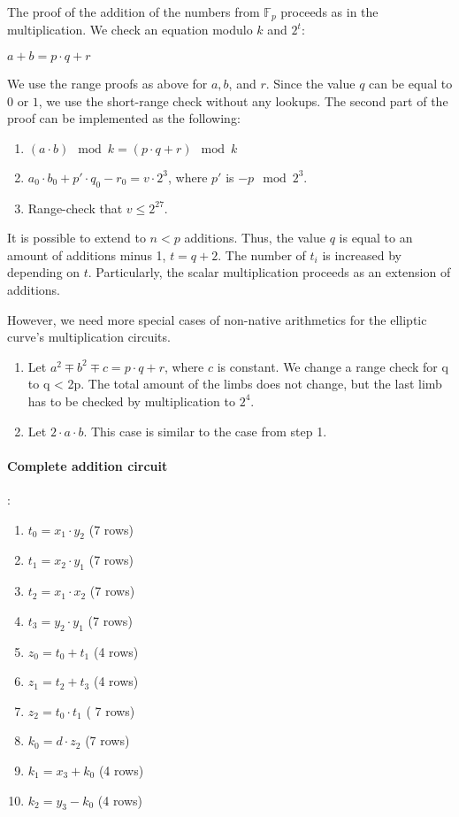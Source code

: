 The proof of the addition of the numbers from $\mathbb{F}_p$ proceeds as in the multiplication.
We check an equation modulo $k$ and $2^t$:
\begin{center}
$a + b = p\cdot q + r$
\end{center}
We use the range proofs as above for $a, b$, and $r$.
Since the value $q$ can be equal to $0$ or $1$, we use the short-range check without any lookups.
The second part of the proof can be implemented as the following:
\begin{enumerate}
\item $(a\cdot b) \mod k = (p \cdot q + r) \mod k$
\item $a_0 \cdot b_0 + p'\cdot q_0 - r_0 = v \cdot 2^3$, where $p'$ is $- p \mod 2^3$.
\item Range-check that $v \leq 2^{27}$.
\end{enumerate} 
It is possible to extend to $n < p$ additions.
Thus, the value $q$ is equal to an amount of additions minus 1, $t = q + 2$.
The number of $t_i $ is increased by depending on $t$.
Particularly, the scalar multiplication proceeds as an extension of additions.

However, we need more special cases of non-native arithmetics for the elliptic curve's multiplication circuits.
\begin{enumerate}
\item Let $a^2 \mp b^2 \mp c = p \cdot q + r$, where $c$ is constant. 
We change a range check for q to q < 2p.
The total amount of the limbs does not change, but the last limb has to be checked by multiplication to $2^4$.
\item Let $2 \cdot a \cdot b$.
This case is similar to the case from step 1.
\end{enumerate}

\paragraph{Complete addition circuit}:
\begin{enumerate}
\item $t_0 = x_1 \cdot y_2$ (7 rows)
\item $t_1 =  x_2 \cdot y_1$ (7 rows)
\item $t_2 =  x_1 \cdot x_2$ (7 rows)
\item $t_3 =  y_2 \cdot y_1$ (7 rows)
\item $z_0 = t_0 + t_1$ (4 rows)
\item $z_1 = t_2 + t_3$ (4 rows)
\item $z_2 = t_0 \cdot t_1$ ( 7 rows)
\item $k_0 = d \cdot z_2$ (7 rows)
\item $k_1 = x_3 + k_0$ (4 rows)
\item $k_2 = y_3 - k_0$ (4 rows)
\end{enumerate}

